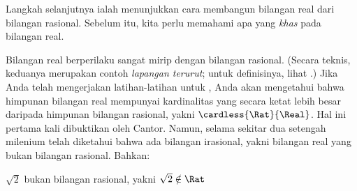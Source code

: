 \documentclass[../../../include/open-logic-section]{subfiles}
\begin{document}

Langkah selanjutnya ialah menunjukkan cara membangun bilangan real dari
bilangan rasional. Sebelum itu, kita perlu memahami apa yang
\emph{khas} pada bilangan real.

Bilangan real berperilaku sangat mirip dengan bilangan rasional. (Secara
teknis, keduanya merupakan contoh \emph{lapangan terurut}; untuk definisinya,
lihat .) Jika Anda telah mengerjakan latihan-latihan
untuk , Anda akan mengetahui bahwa himpunan bilangan
real mempunyai kardinalitas yang secara ketat lebih besar daripada himpunan
bilangan rasional, yakni $\cardless{\Rat}{\Real}$.
Hal ini pertama kali dibuktikan oleh Cantor. Namun, selama sekitar dua setengah
milenium telah diketahui bahwa ada bilangan irasional, yakni bilangan real yang
bukan bilangan rasional. Bahkan:
\begin{thm}
$\sqrt{2}$ bukan bilangan rasional, yakni $\sqrt{2} \notin \Rat$
\end{thm}
\end{document}
